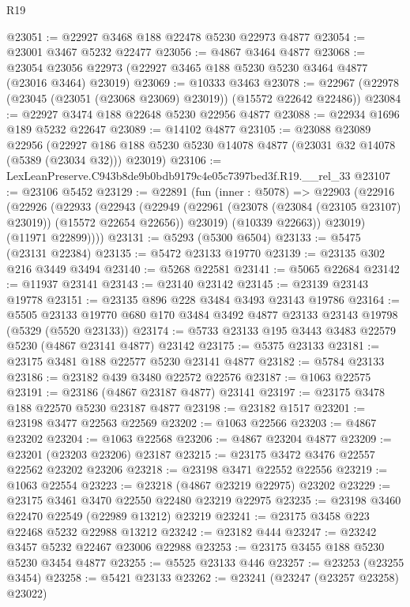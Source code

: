 \begin{lexlean}{R19}
\begin{coremodule}
@23051 := @22927 @3468 @188 @22478 @5230 @22973 @4877
@23054 := @23001 @3467 @5232 @22477
@23056 := @4867 @3464 @4877
@23068 := @23054 @23056 @22973 (@22927 @3465 @188 @5230 @5230 @3464 @4877 (@23016 @3464) @23019)
@23069 := @10333 @3463
@23078 := @22967 (@22978 (@23045 (@23051 (@23068 @23069) @23019)) (@15572 @22642 @22486))
@23084 := @22927 @3474 @188 @22648 @5230 @22956 @4877
@23088 := @22934 @1696 @189 @5232 @22647
@23089 := @14102 @4877
@23105 := @23088
    @23089
    @22956
    (@22927 @186 @188 @5230 @5230 @14078 @4877 (@23031 @32 @14078 (@5389 (@23034 @32))) @23019)
@23106 := LexLeanPreserve.C943b8de9b0bdb9179c4e05c7397bed3f.R19.__rel_33
@23107 := @23106 @5452
@23129 := @22891
    (fun (inner : @5078) =>
    @22903
      (@22916
        (@22926
          (@22933
            (@22943
              (@22949
                (@22961 (@23078 (@23084 (@23105 @23107) @23019)) (@15572 @22654 @22656))
                @23019)
              (@10339 @22663))
            @23019)
          (@11971 @22899))))
@23131 := @5293 (@5300 @6504)
@23133 := @5475 (@23131 @22384)
@23135 := @5472 @23133 @19770
@23139 := @23135 @302 @216 @3449 @3494
@23140 := @5268 @22581
@23141 := @5065 @22684
@23142 := @11937 @23141
@23143 := @23140 @23142
@23145 := @23139 @23143 @19778
@23151 := @23135 @896 @228 @3484 @3493 @23143 @19786
@23164 := @5505
    @23133
    @19770
    @680
    @170
    @3484
    @3492
    @4877
    @23133
    @23143
    @19798
    (@5329 (@5520 @23133))
@23174 := @5733 @23133 @195 @3443 @3483 @22579 @5230 (@4867 @23141 @4877) @23142
@23175 := @5375 @23133
@23181 := @23175 @3481 @188 @22577 @5230 @23141 @4877
@23182 := @5784 @23133
@23186 := @23182 @439 @3480 @22572 @22576
@23187 := @1063 @22575
@23191 := @23186 (@4867 @23187 @4877) @23141
@23197 := @23175 @3478 @188 @22570 @5230 @23187 @4877
@23198 := @23182 @1517
@23201 := @23198 @3477 @22563 @22569
@23202 := @1063 @22566
@23203 := @4867 @23202
@23204 := @1063 @22568
@23206 := @4867 @23204 @4877
@23209 := @23201 (@23203 @23206) @23187
@23215 := @23175 @3472 @3476 @22557 @22562 @23202 @23206
@23218 := @23198 @3471 @22552 @22556
@23219 := @1063 @22554
@23223 := @23218 (@4867 @23219 @22975) @23202
@23229 := @23175 @3461 @3470 @22550 @22480 @23219 @22975
@23235 := @23198 @3460 @22470 @22549 (@22989 @13212) @23219
@23241 := @23175 @3458 @223 @22468 @5232 @22988 @13212
@23242 := @23182 @444
@23247 := @23242 @3457 @5232 @22467 @23006 @22988
@23253 := @23175 @3455 @188 @5230 @5230 @3454 @4877
@23255 := @5525 @23133 @446
@23257 := @23253 (@23255 @3454)
@23258 := @5421 @23133
@23262 := @23241 (@23247 (@23257 @23258) @23022)

\end{coremodule}
\end{lexlean}
